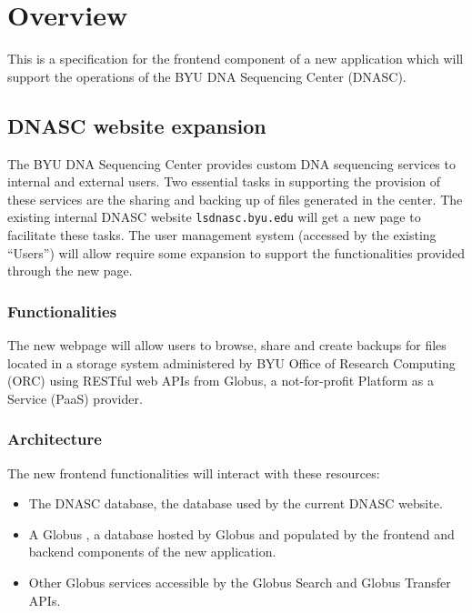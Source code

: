 
\section{Overview}

This is a specification for the frontend component of a new application which will
support the operations of the BYU DNA Sequencing Center (DNASC).

\subsection{DNASC website expansion}

The BYU DNA Sequencing Center provides custom DNA sequencing services to internal and 
external users. Two essential tasks in supporting the provision of these services are 
the sharing and backing up of files generated in the center. The existing internal DNASC 
website \texttt{lsdnasc.byu.edu} will get a new page to facilitate these tasks. The
user management system (accessed by the existing ``Users'') will allow require some 
expansion to support the functionalities provided through the new page.

\subsubsection{Functionalities}

The new webpage will allow users to browse, share and create backups for files located in a 
storage system administered by BYU Office of Research Computing (ORC) using RESTful web 
APIs from Globus, a not-for-profit Platform as a Service (PaaS) provider.

\subsubsection{Architecture}

The new frontend functionalities will interact with these resources:
\begin{itemize}
    \item The DNASC database, the database used by the current DNASC website.
    \item A Globus , a database hosted by Globus and populated 
    by the frontend and backend components of the new application.
    \item Other Globus services accessible by the Globus Search and Globus Transfer APIs.
\end{itemize}

